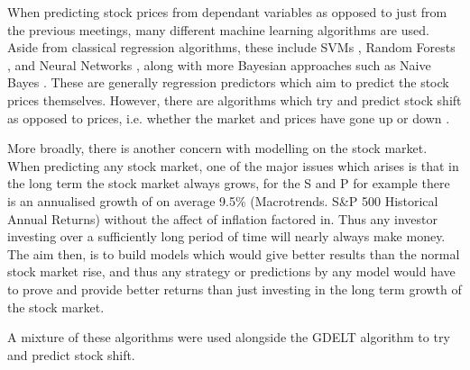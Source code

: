 When predicting stock prices from dependant variables as opposed to just from the previous meetings, many different machine learning algorithms are used. Aside from classical regression algorithms, these include SVMs \cite{cao2003support}, Random Forests \cite{khaidem2016predicting}, and Neural Networks \cite{egeli2003stock}, along with more Bayesian approaches such as Naive Bayes \cite{khedr2017predicting}. These are generally regression predictors which aim to predict the stock prices themselves. However, there are algorithms which try and predict stock shift as opposed to prices, i.e. whether the market and prices have gone up or down \cite{nguyen2015sentiment}.  

More broadly, there is another concern with modelling on the stock market. When predicting any stock market, one of the major issues which arises is that in the long term the stock market always grows, for the S and P for example there is an annualised growth of on average 9.5\% (Macrotrends. S\&P 500 Historical Annual Returns) without the affect of inflation factored in. Thus any investor investing over a sufficiently long period of time will nearly always make money. The aim then, is to build models which would give better results than the normal stock market rise, and thus any strategy or predictions by any model would have to prove and provide better returns than just investing in the long term growth of the stock market.

A mixture of these algorithms were used alongside the GDELT algorithm to try and predict stock shift. 

